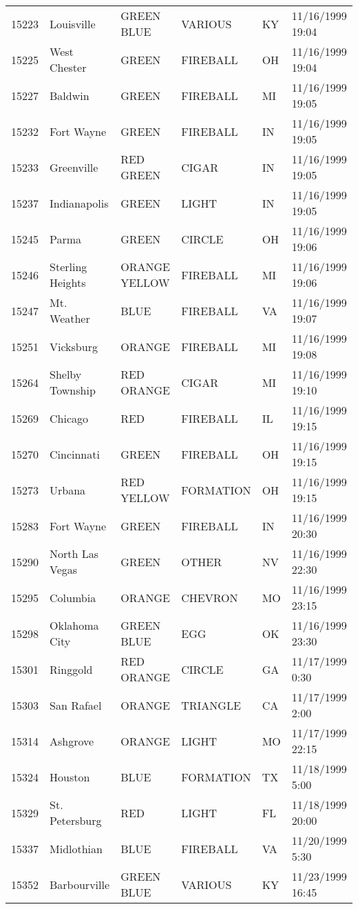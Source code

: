 \begin{tabular}{llllll}
15223 & Louisville & GREEN BLUE & VARIOUS & KY & 11/16/1999 19:04 \\
15225 & West Chester & GREEN & FIREBALL & OH & 11/16/1999 19:04 \\
15227 & Baldwin & GREEN & FIREBALL & MI & 11/16/1999 19:05 \\
15232 & Fort Wayne & GREEN & FIREBALL & IN & 11/16/1999 19:05 \\
15233 & Greenville & RED GREEN & CIGAR & IN & 11/16/1999 19:05 \\
15237 & Indianapolis & GREEN & LIGHT & IN & 11/16/1999 19:05 \\
15245 & Parma & GREEN & CIRCLE & OH & 11/16/1999 19:06 \\
15246 & Sterling Heights & ORANGE YELLOW & FIREBALL & MI & 11/16/1999 19:06 \\
15247 & Mt. Weather & BLUE & FIREBALL & VA & 11/16/1999 19:07 \\
15251 & Vicksburg & ORANGE & FIREBALL & MI & 11/16/1999 19:08 \\
15264 & Shelby Township & RED ORANGE & CIGAR & MI & 11/16/1999 19:10 \\
15269 & Chicago & RED & FIREBALL & IL & 11/16/1999 19:15 \\
15270 & Cincinnati & GREEN & FIREBALL & OH & 11/16/1999 19:15 \\
15273 & Urbana & RED YELLOW & FORMATION & OH & 11/16/1999 19:15 \\
15283 & Fort Wayne & GREEN & FIREBALL & IN & 11/16/1999 20:30 \\
15290 & North Las Vegas & GREEN & OTHER & NV & 11/16/1999 22:30 \\
15295 & Columbia & ORANGE & CHEVRON & MO & 11/16/1999 23:15 \\
15298 & Oklahoma City & GREEN BLUE & EGG & OK & 11/16/1999 23:30 \\
15301 & Ringgold & RED ORANGE & CIRCLE & GA & 11/17/1999 0:30 \\
15303 & San Rafael & ORANGE & TRIANGLE & CA & 11/17/1999 2:00 \\
15314 & Ashgrove & ORANGE & LIGHT & MO & 11/17/1999 22:15 \\
15324 & Houston & BLUE & FORMATION & TX & 11/18/1999 5:00 \\
15329 & St. Petersburg & RED & LIGHT & FL & 11/18/1999 20:00 \\
15337 & Midlothian & BLUE & FIREBALL & VA & 11/20/1999 5:30 \\
15352 & Barbourville & GREEN BLUE & VARIOUS & KY & 11/23/1999 16:45 \\

\end{tabular}
